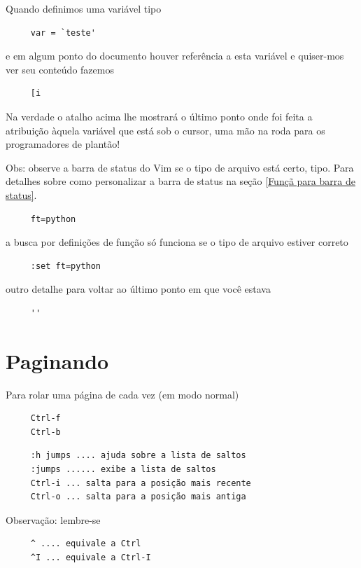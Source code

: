 \documentclass[10pt,a4paper,openany]{book}
\begin{document}
Quando definimos uma variável tipo

\begin{verbatim}
     var = `teste'
\end{verbatim}

e em algum ponto do documento houver referência a esta variável e
quiser-mos ver seu conteúdo fazemos

\begin{verbatim}
     [i
\end{verbatim}
Na verdade o atalho acima lhe mostrará o último ponto onde foi feita
a atribuição àquela variável que está sob o cursor, uma mão na roda
para os programadores de plantão!

Obs: observe a  barra de status do Vim se o tipo de arquivo está certo,
tipo. Para detalhes sobre como personalizar a barra de status na seção
\ref{Funçã para barra de status}.

\begin{verbatim}
     ft=python
\end{verbatim}

a busca por definições de função só funciona se o tipo de arquivo
estiver correto

\begin{verbatim}
     :set ft=python
\end{verbatim}

outro detalhe para voltar ao último ponto em que você estava

\begin{verbatim}
     ''
\end{verbatim}

\section{Paginando}
\label{Paginando}

Para rolar uma página de cada vez (em modo normal)

\begin{verbatim}
     Ctrl-f
     Ctrl-b
\end{verbatim}


\begin{verbatim}
     :h jumps .... ajuda sobre a lista de saltos
     :jumps ...... exibe a lista de saltos
     Ctrl-i ... salta para a posição mais recente
     Ctrl-o ... salta para a posição mais antiga
\end{verbatim}

Observação: lembre-se

\begin{verbatim}
     ^ .... equivale a Ctrl
     ^I ... equivale a Ctrl-I
\end{verbatim}
\end{document}
